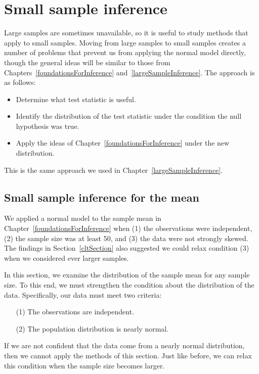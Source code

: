 
\chapter{Small sample inference}
\label{smallSampleInference}

Large samples are sometimes unavailable, so it is useful to study methods that apply to small samples. Moving from large samples to small samples creates a number of problems that prevent us from applying the normal model directly, though the general ideas will be similar to those from Chapters~\ref{foundationsForInference} and~\ref{largeSampleInference}. The approach is as follows:
\begin{itemize}
\setlength{\itemsep}{0mm}
\item Determine what test statistic is useful.
\item Identify the distribution of the test statistic under the condition the null hypothesis was true.
\item Apply the ideas of Chapter~\ref{foundationsForInference} under the new distribution.
\end{itemize}
This is the same approach we used in Chapter~\ref{largeSampleInference}.

\section{Small sample inference for the mean}
\label{smallSampleInferenceForTheMean}

We applied a normal model to the sample mean in Chapter~\ref{foundationsForInference} when (1) the observations were independent, (2) the sample size was at least 50, and (3) the data were not strongly skewed. The findings in Section~\ref{cltSection} also suggested we could relax condition (3) when we considered ever larger samples.

In this section, we examine the distribution of the sample mean for any sample size. To this end, we must strengthen the condition about the distribution of the data. Specifically, our data must meet two criteria:
\begin{enumerate}
\item[(1)] The observations are independent.
\item[(2)] The population distribution is nearly normal.
\end{enumerate}
If we are not confident that the data come from a nearly normal distribution, then we cannot apply the methods of this section. Just like before, we can relax this condition when the sample size becomes larger.

